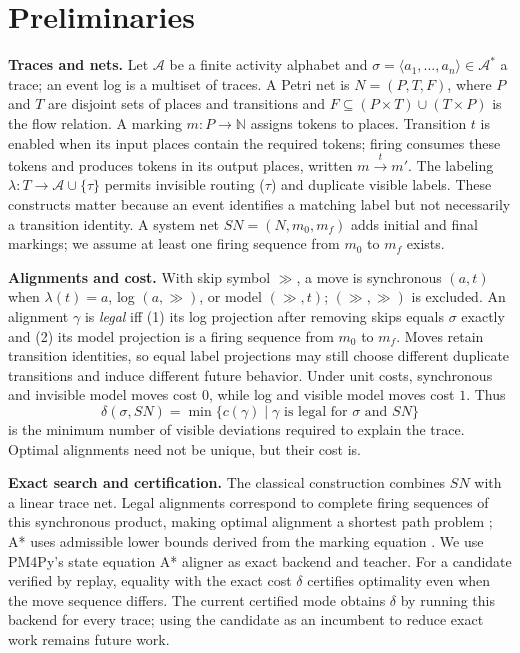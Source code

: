\documentclass[manuscript,screen,nonacm]{acmart}
\begin{document}
\section{Preliminaries}
\label{sec:preliminaries}

\textbf{Traces and nets.} Let $\mathcal{A}$ be a finite activity alphabet and $\sigma = \langle a_1,\ldots,a_n\rangle\in\mathcal{A}^*$ a trace; an event log is a multiset of traces. A Petri net is $N=(P,T,F)$, where $P$ and $T$ are disjoint sets of places and transitions and $F\subseteq(P\times T)\cup(T\times P)$ is the flow relation. A marking $m:P\to\mathbb{N}$ assigns tokens to places. Transition $t$ is enabled when its input places contain the required tokens; firing consumes these tokens and produces tokens in its output places, written $m\xrightarrow{t}m'$. The labeling $\lambda:T\to\mathcal{A}\cup\{\tau\}$ permits invisible routing ($\tau$) and duplicate visible labels. These constructs matter because an event identifies a matching label but not necessarily a transition identity. A system net $SN=(N,m_0,m_f)$ adds initial and final markings; we assume at least one firing sequence from $m_0$ to $m_f$ exists.

\textbf{Alignments and cost.} With skip symbol $\gg$, a move is synchronous $(a,t)$ when $\lambda(t)=a$, log $(a,\gg)$, or model $(\gg,t)$; $(\gg,\gg)$ is excluded. An alignment $\gamma$ is \emph{legal} iff (1) its log projection after removing skips equals $\sigma$ exactly and (2) its model projection is a firing sequence from $m_0$ to $m_f$. Moves retain transition identities, so equal label projections may still choose different duplicate transitions and induce different future behavior. Under unit costs, synchronous and invisible model moves cost $0$, while log and visible model moves cost $1$. Thus
\[
  \delta(\sigma,SN)=\min\{c(\gamma)\mid \gamma\text{ is legal for }\sigma\text{ and }SN\}
\]
is the minimum number of visible deviations required to explain the trace. Optimal alignments need not be unique, but their cost is.

\textbf{Exact search and certification.} The classical construction combines $SN$ with a linear trace net. Legal alignments correspond to complete firing sequences of this synchronous product, making optimal alignment a shortest path problem \cite{Zelst2018}; A* uses admissible lower bounds derived from the marking equation \cite{Dongen2018}. We use PM4Py's state equation A* aligner \cite{Berti2023} as exact backend and teacher. For a candidate verified by replay, equality with the exact cost $\delta$ certifies optimality even when the move sequence differs. The current certified mode obtains $\delta$ by running this backend for every trace; using the candidate as an incumbent to reduce exact work remains future work.
\end{document}
